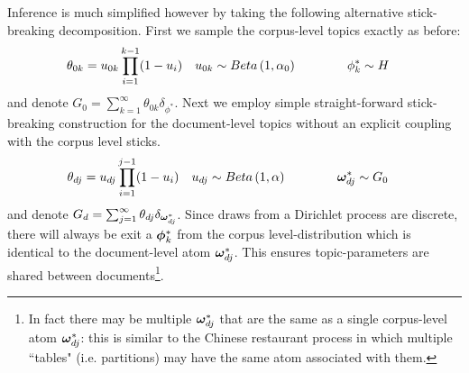 Inference is much simplified however by taking the following alternative stick-breaking decomposition\cite{Wang2011a}. First we sample the corpus-level topics exactly as before:
\begin{align}
\theta_{0k} & = u_{0k} \prod_{i=1}^{k-1}(1-u_i) &
u_{0k} & \sim Beta \left( {1}, {\alpha_0} \right) \qquad\qquad
\phi^*_k \sim H 
\end{align}
and denote $G_0 = \sum_{k=1}^{\infty} \theta_{0k}\delta_{\phi^*}$. Next we employ simple straight-forward stick-breaking construction for the document-level topics without an explicit coupling with the corpus level sticks.
\begin{align}
\theta_{dj} & = u_{dj} \prod_{i=1}^{j-1}(1-u_i) &
u_{dj} & \sim Beta \left( {1}, {\alpha} \right) \qquad\qquad
\bm \omega^*_{dj} \sim G_0
\end{align}
and denote $G_d = \sum_{j=1}^{\infty} \theta_{dj}\delta_{\bm \omega^*_{dj}}$. Since draws from a Dirichlet process are discrete, there will always be exit a $\bm \phi_k^*$ from the corpus level-distribution which is identical to the document-level atom $\bm \omega_{dj}^*$. This ensures topic-parameters are shared between documents\footnote{In fact there may be multiple $\bm \omega_{dj}^*$ that are the same as a single corpus-level atom $\bm \omega_{dj}^*$: this is similar to the Chinese restaurant process in which multiple ``tables" (i.e. partitions) may have the same atom associated with them.}.

